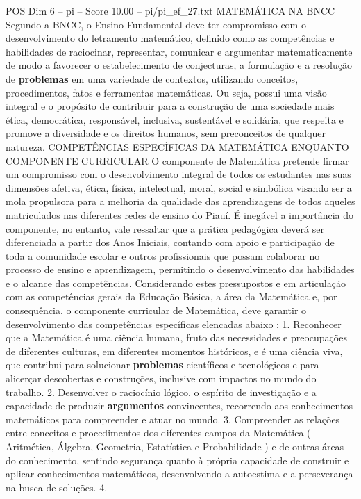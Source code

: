 \begin{textsample}{POS Dim 6 – pi – Score 10.00 – pi/pi\_ef\_27.txt}  \label{ex:f6_pos_191}
MATEMÁTICA NA BNCC Segundo a BNCC, o Ensino Fundamental deve ter compromisso com o desenvolvimento do letramento matemático, definido como as competências e habilidades de raciocinar, representar, comunicar e argumentar matematicamente de modo a favorecer o estabelecimento de conjecturas, a formulação e a resolução de \textbf{problemas} em uma variedade de contextos, utilizando conceitos, procedimentos, fatos e ferramentas matemáticas.
Ou seja, possui uma visão integral e o propósito de contribuir para a construção de uma sociedade mais ética, democrática, responsável, inclusiva, sustentável e solidária, que respeita e promove a diversidade e os direitos humanos, sem preconceitos de qualquer natureza.
COMPETÊNCIAS ESPECÍFICAS DA MATEMÁTICA ENQUANTO COMPONENTE CURRICULAR O componente de Matemática pretende firmar um compromisso com o desenvolvimento integral de todos os estudantes nas suas dimensões afetiva, ética, física, intelectual, moral, social e simbólica visando ser a mola propulsora para a melhoria da qualidade das aprendizagens de todos aqueles matriculados nas diferentes redes de ensino do Piauí.
É inegável a importância do componente, no entanto, vale ressaltar que a prática pedagógica deverá ser diferenciada a partir dos Anos Iniciais, contando com apoio e participação de toda a comunidade escolar e outros profissionais que possam colaborar no processo de ensino e aprendizagem, permitindo o desenvolvimento das habilidades e o alcance das competências.
Considerando estes pressupostos e em articulação com as competências gerais da Educação Básica, a área da Matemática e, por consequência, o componente curricular de Matemática, deve garantir o desenvolvimento das competências específicas elencadas abaixo : 1.
Reconhecer que a Matemática é uma ciência humana, fruto das necessidades e preocupações de diferentes culturas, em diferentes momentos históricos, e é uma ciência viva, que contribui para solucionar \textbf{problemas} científicos e tecnológicos e para alicerçar descobertas e construções, inclusive com impactos no mundo do trabalho. 2.
Desenvolver o raciocínio lógico, o espírito de investigação e a capacidade de produzir \textbf{argumentos} convincentes, recorrendo aos conhecimentos matemáticos para compreender e atuar no mundo. 3.
Compreender as relações entre conceitos e procedimentos dos diferentes campos da Matemática ( Aritmética, Álgebra, Geometria, Estatística e Probabilidade ) e de outras áreas do conhecimento, sentindo segurança quanto à própria capacidade de construir e aplicar conhecimentos matemáticos, desenvolvendo a autoestima e a perseverança na busca de soluções. 4.

\end{textsample}
